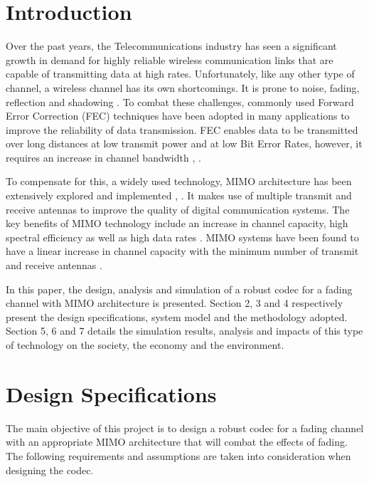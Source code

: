 \documentclass[pdftex,11pt,a4paper]{article}
\begin{document}


\tableofcontents

\newpage
\section{Introduction}
Over the past years, the Telecommunications industry has seen a significant growth in demand for highly reliable wireless communication links that are capable of transmitting data at high rates. Unfortunately, like any other type of channel, a wireless channel has its own shortcomings. It is prone to noise, fading, reflection and shadowing \cite{22}. To combat these challenges, commonly used Forward Error Correction (FEC) techniques have been adopted in many applications to improve the reliability of data transmission. FEC enables data to be transmitted over long distances at low transmit power and at low Bit Error Rates, however, it requires an increase in channel bandwidth \cite{22}, \cite{18}.

To compensate for this, a widely used technology, MIMO architecture has been extensively explored and implemented \cite{18_1}, \cite{42}. It makes use of multiple transmit and receive antennas to improve the quality of digital communication systems. The key benefits of MIMO technology include an increase in channel capacity, high spectral efficiency as well as high data rates \cite{3}. MIMO systems have been found to have a linear increase in channel capacity with the minimum number of transmit and receive antennas \cite{42}.

In this paper, the design, analysis and simulation of a robust codec for a fading channel with MIMO architecture is presented. Section 2, 3 and 4 respectively present the design specifications, system model and the methodology adopted. Section 5, 6 and 7 details the simulation results, analysis and impacts of this type of technology on the society, the economy and the environment.




%
\section{Design Specifications}
The main objective of this project is to design a robust codec for a fading channel with an appropriate MIMO architecture that will combat the effects of fading. The following requirements and assumptions are taken into consideration when designing the codec. 
\end{document}
